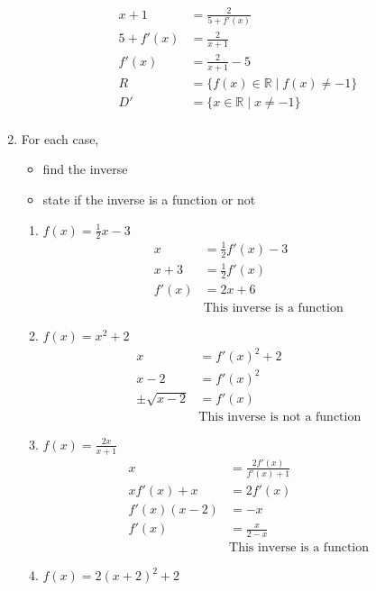 \documentclass[paper=a4, fontsize=11pt]{scrartcl}
\begin{document}
\begin{enumerate}[resume]
\begin{align*}
            x+1&=\frac{2}{5+f'(x)}\\
            5+f'(x)&=\frac{2}{x+1}\\
            f'(x)&=\frac{2}{x+1}-5\\
            R&=\{f(x)\in\mathbb{R}\mid f(x)\neq -1\}\\
            D'&=\{x\in\mathbb{R}\mid x\neq -1\}\\
        \end{align*}
        \item For each case,
        \begin{itemize}
            \item find the inverse
            \item state if the inverse is a function or not
        \end{itemize}
        \begin{enumerate}
            \item $f(x)=\frac{1}{2}x-3$
            \begin{align*}
                x&=\frac{1}{2}f'(x)-3\\
                x+3&=\frac{1}{2}f'(x)\\
                f'(x)&=2x+6\\
                &\text{This inverse is a function}
            \end{align*}
            \item $f(x)=x^2+2$
            \begin{align*}
                x&=f'(x)^2+2\\
                x-2&=f'(x)^2\\
                \pm\sqrt{x-2}&=f'(x)\\
                &\text{This inverse is not a function}
            \end{align*}
            \item $f(x)=\frac{2x}{x+1}$
            \begin{align*}
                x&=\frac{2f'(x)}{f'(x)+1}\\
                x f'(x)+x&=2f'(x)\\
                f'(x)(x-2)&=-x\\
                f'(x)&=\frac{x}{2-x}\\
                &\text{This inverse is a function}
            \end{align*}
            \item $f(x)=2(x+2)^2+2$
            \begin{align*}

\end{align*}
\end{enumerate}
\end{enumerate}
\end{document}
